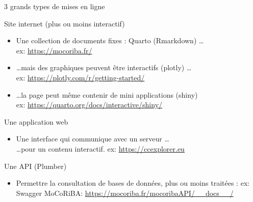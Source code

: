 \documentclass[pdftex,xcolor={table}]{beamer} %
\begin{document}
  \begin{frame}{3 grands types de mises en ligne}
    \begin{block}{Site internet (plus ou moins interactif)}
      \begin{itemize}
        \item Une collection de documents fixes : Quarto (Rmarkdown) \ldots\\
          ex: \url{https://mocoriba.fr/}
        \item \ldots mais des graphiques peuvent être interactifs (plotly) \ldots\\
          ex: \url{https://plotly.com/r/getting-started/}
        \item \ldots la page peut même contenir de mini applications (shiny) \\
          ex: \url{https://quarto.org/docs/interactive/shiny/}
      \end{itemize}
    \end{block}

    \begin{block}{Une application web}
      \begin{itemize}
        \item Une interface qui communique avec un serveur \ldots \\
        \ldots pour un contenu interactif.
          ex: \href{https://ccexplorer.eu}{https://ccexplorer.eu}
      \end{itemize}
    \end{block}

    \begin{block}{Une API (Plumber)}
    \begin{itemize}
      \item Permettre la consultation de bases de données, plus ou moins traitées :
        ex: Swagger MoCoRiBA: \url{https://mocoriba.fr/mocoribaAPI/\_\_docs\_\_/}
    \end{itemize}
    \end{block}
  \end{frame}
\end{document}
